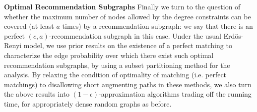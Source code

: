 \noindent
{\bf Optimal Recommendation Subgraphs}
Finally we turn to the question of whether the maximum number of nodes allowed
by the degree constraints can be covered (at least $a$ times) by a recommendation
subgraph: we say that there is an perfect $(c,a)$-recommendation subgraph in this
case. Under the usual Erd\"os-Renyi model, we use prior results on the
existence of a perfect matching to characterize the edge probability over which
there exist such optimal recommendation subgraphs, by using a subset partitioning
method for the analysis. By relaxing the condition of optimality of matching (i.e.
perfect matchings) to disallowing short augmenting paths in these methods, we also
turn the above results into $(1-\epsilon)$-approximation algorithms trading off
the running time, for appropriately dense random graphs as before. \vs
